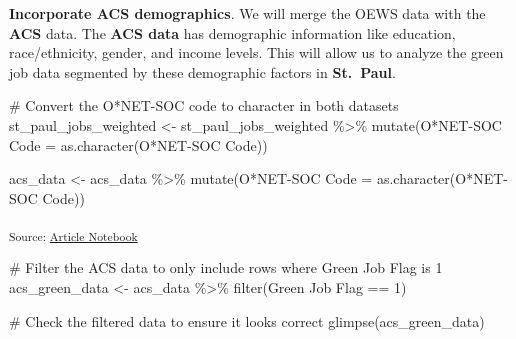 \documentclass[
  letterpaper,
  DIV=11,
  numbers=noendperiod]{scrartcl}
\newenvironment{Shaded}{\begin{snugshade}}{\end{snugshade}}
\newcommand{\AttributeTok}[1]{\textcolor[rgb]{0.40,0.45,0.13}{#1}}
\newcommand{\CommentTok}[1]{\textcolor[rgb]{0.37,0.37,0.37}{#1}}
\newcommand{\DecValTok}[1]{\textcolor[rgb]{0.68,0.00,0.00}{#1}}
\newcommand{\FunctionTok}[1]{\textcolor[rgb]{0.28,0.35,0.67}{#1}}
\newcommand{\NormalTok}[1]{\textcolor[rgb]{0.00,0.23,0.31}{#1}}
\newcommand{\OtherTok}[1]{\textcolor[rgb]{0.00,0.23,0.31}{#1}}
\newcommand{\SpecialCharTok}[1]{\textcolor[rgb]{0.37,0.37,0.37}{#1}}
\newcommand{\StringTok}[1]{\textcolor[rgb]{0.13,0.47,0.30}{#1}}
\begin{document}
\textbf{Incorporate ACS demographics}. We will merge the OEWS data with
the \textbf{ACS} data. The \textbf{ACS data} has demographic information
like education, race/ethnicity, gender, and income levels. This will
allow us to analyze the green job data segmented by these demographic
factors in \textbf{St.~Paul}.

\begin{Shaded}
\begin{Highlighting}[]
\CommentTok{\# Convert the O*NET{-}SOC code to character in both datasets}
\NormalTok{st\_paul\_jobs\_weighted }\OtherTok{\textless{}{-}}\NormalTok{ st\_paul\_jobs\_weighted }\SpecialCharTok{\%\textgreater{}\%}
  \FunctionTok{mutate}\NormalTok{(}\StringTok{\textasciigrave{}}\AttributeTok{O*NET{-}SOC Code}\StringTok{\textasciigrave{}} \OtherTok{=} \FunctionTok{as.character}\NormalTok{(}\StringTok{\textasciigrave{}}\AttributeTok{O*NET{-}SOC Code}\StringTok{\textasciigrave{}}\NormalTok{))}

\NormalTok{acs\_data }\OtherTok{\textless{}{-}}\NormalTok{ acs\_data }\SpecialCharTok{\%\textgreater{}\%}
  \FunctionTok{mutate}\NormalTok{(}\StringTok{\textasciigrave{}}\AttributeTok{O*NET{-}SOC Code}\StringTok{\textasciigrave{}} \OtherTok{=} \FunctionTok{as.character}\NormalTok{(}\StringTok{\textasciigrave{}}\AttributeTok{O*NET{-}SOC Code}\StringTok{\textasciigrave{}}\NormalTok{))}
\end{Highlighting}
\end{Shaded}

\textsubscript{Source:
\href{https://beeckcenter.github.io/climate-equity-workforce/index-preview.html}{Article
Notebook}}

\begin{Shaded}
\begin{Highlighting}[]
\CommentTok{\# Filter the ACS data to only include rows where \textquotesingle{}Green Job Flag\textquotesingle{} is 1}
\NormalTok{acs\_green\_data }\OtherTok{\textless{}{-}}\NormalTok{ acs\_data }\SpecialCharTok{\%\textgreater{}\%} 
  \FunctionTok{filter}\NormalTok{(}\StringTok{\textasciigrave{}}\AttributeTok{Green Job Flag}\StringTok{\textasciigrave{}} \SpecialCharTok{==} \DecValTok{1}\NormalTok{)}

\CommentTok{\# Check the filtered data to ensure it looks correct}
\FunctionTok{glimpse}\NormalTok{(acs\_green\_data)}
\end{Highlighting}
\end{Shaded}
\end{document}
